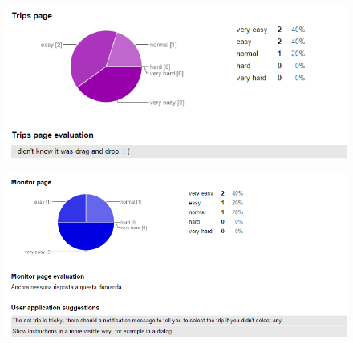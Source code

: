 \begin{figure}[H]
   \centering
   \includegraphics[width=\linewidth]{pictures/survey12.png}
 \end{figure}

 \begin{figure}[H]
   \centering
   \includegraphics[width=\linewidth]{pictures/survey13.png}
 \end{figure}